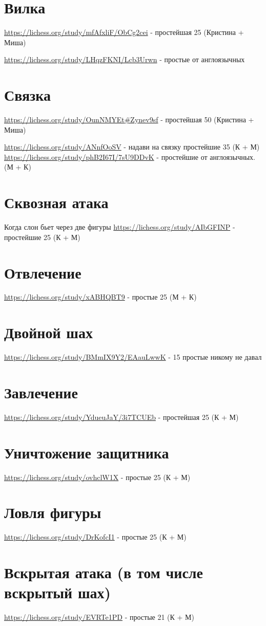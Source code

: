 \documentclass{article}
\begin{document}
\section{Вилка}
\url{https://lichess.org/study/mfAfxliF/ObCg2cei} - простейшая 25 
(Кристина + Миша)

\url{https://lichess.org/study/LHqzFKNI/Lcb3Urwn} - простые от англоязычных
\section{Связка}
\url{https://lichess.org/study/OunNMYEt#Zynev9sf} - простейшая 50
(Кристина + Миша)

\url{https://lichess.org/study/ANnfOoSV} - надави на связку
простейшие 35 (К + М)
\url{https://lichess.org/study/phB2I67I/7sU9DDvK} - простейшие от англоязычных. (М + К)

\section{Сквозная атака}
Когда слон бьет через две фигуры
\url{https://lichess.org/study/AIbGFINP} - простейшие 25 (К + М)
\section{Отвлечение}
\url{https://lichess.org/study/xABHQBT9} - простые 25 (М + К)
\section{Двойной шах}
\url{https://lichess.org/study/BMmIX9Y2/EAauLwwK} - 15 простые никому не давал
\section{Завлечение}
\url{https://lichess.org/study/YdueuJaY/3i7TCUEb} - простейшая 25 (К + М)


\section{Уничтожение защитника}
\url{https://lichess.org/study/ovhclW1X} - простые 25 (К + М)

\section{Ловля фигуры}
\url{https://lichess.org/study/DrKofcI1} - простые 25 (К + М)
\section{Вскрытая атака (в том числе вскрытый шах)}
\url{https://lichess.org/study/EVRTe1PD} - простые 21 (К + М)
\end{document}
